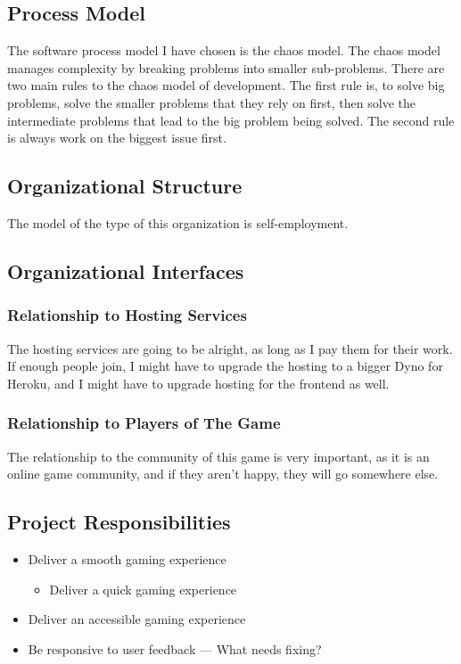 \documentclass[11pt]{article}
\begin{document}
\subsection{Process Model}
\label{sec:org3c03746}
The software process model I have chosen is the chaos model. The chaos model manages complexity by breaking
problems into smaller sub-problems. There are two main rules to the chaos model of development.
The first rule is, to solve big problems, solve the smaller problems that they rely on first, 
then solve the intermediate problems that lead to the big problem being solved. The second rule is
always work on the biggest issue first.
\subsection{Organizational Structure}
\label{sec:orgec1757e}
The model of the type of this organization is self-employment.
\subsection{Organizational Interfaces}
\label{sec:orge6e07c2}
\subsubsection{Relationship to Hosting Services}
\label{sec:orgd3aaa0f}
The hosting services are going to be alright, as long as I pay them for their work. If enough people join, I
might have to upgrade the hosting to a bigger Dyno for Heroku, and I might have to upgrade hosting for the frontend
as well.
\subsubsection{Relationship to Players of The Game}
\label{sec:orga87a640}
The relationship to the community of this game is very important, as it is an online game community, and if they
aren't happy, they will go somewhere else.
\subsection{Project Responsibilities}
\label{sec:orgddfc7f8}
\begin{itemize}
\item Deliver a smooth gaming experience
\begin{itemize}
\item Deliver a quick gaming experience
\end{itemize}
\item Deliver an accessible gaming experience
\item Be responsive to user feedback --- What needs fixing?
\end{itemize}
\end{document}
